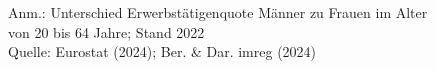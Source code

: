\begin{figure}[p]
	{\centering {}}
	\label{map:geschlecht}
	\begin{spacing}{1} \scriptsize
		Anm.: Unterschied Erwerbstätigenquote Männer zu Frauen im Alter von 20 bis 64 Jahre; Stand 2022\\
		Quelle: Eurostat (2024); Ber. \& Dar. imreg (2024) \end{spacing}
\end{figure}
